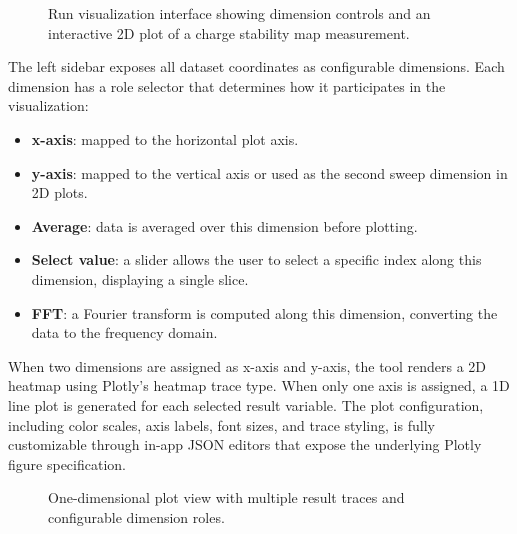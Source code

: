 
\begin{figure}[H]
\caption{Run visualization interface showing dimension controls and an interactive 2D plot of a charge stability map measurement.}
\label{fig:inspector_runview_2d}
\end{figure}

The left sidebar exposes all dataset coordinates as configurable dimensions.
Each dimension has a role selector that determines how it participates in the visualization:
\begin{itemize}
    \item \textbf{x-axis}: mapped to the horizontal plot axis.
    \item \textbf{y-axis}: mapped to the vertical axis or used as the second sweep dimension in 2D plots.
    \item \textbf{Average}: data is averaged over this dimension before plotting.
    \item \textbf{Select value}: a slider allows the user to select a specific index along this dimension, displaying a single slice.
    \item \textbf{FFT}: a Fourier transform is computed along this dimension, converting the data to the frequency domain.
\end{itemize}

When two dimensions are assigned as x-axis and y-axis, the tool renders a 2D heatmap using Plotly's heatmap trace type.
When only one axis is assigned, a 1D line plot is generated for each selected result variable.
The plot configuration, including color scales, axis labels, font sizes, and trace styling, is fully customizable through in-app JSON editors that expose the underlying Plotly figure specification.


\begin{figure}[H]
\caption{One-dimensional plot view with multiple result traces and configurable dimension roles.}
\label{fig:inspector_runview_1d}
\end{figure}

